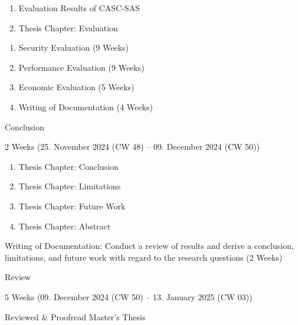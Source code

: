 \begin{description}
\begin{description}[style=multiline, leftmargin=\widthof{\textbf{Deliverables:}}]
        \begin{enumerate}[label=\alph*), leftmargin=\widthof{a)}+\labelsep]
            \item Evaluation Results of CASC-SAS
            \item Thesis Chapter: Evaluation
        \end{enumerate}
        \item[Increments:]
        \begin{enumerate}[label=\arabic*), leftmargin=\widthof{a)}+\labelsep]
            \item Security Evaluation (9 Weeks)
            \item Performance Evaluation (9 Weeks)
            \item Economic Evaluation (5 Weeks)
            \item Writing of Documentation (4 Weeks)
        \end{enumerate}
    \end{description}
    \item[Milestone IV:] Conclusion
    \begin{description}[style=multiline, leftmargin=\widthof{\textbf{Deliverables:}}]
        \item[Duration:] 2 Weeks (25. November 2024 (CW 48) -- 09. December 2024 (CW 50))
        \item[Deliverables:]
        \begin{enumerate}[label=\alph*), leftmargin=\widthof{a)}+\labelsep]
            \item Thesis Chapter: Conclusion
            \item Thesis Chapter: Limitations
            \item Thesis Chapter: Future Work
            \item Thesis Chapter: Abstract
        \end{enumerate}
        \item[Increment:] Writing of Documentation: Conduct a review of results and derive a conclusion, limitations, and future work with regard to the research questions (2 Weeks)
    \end{description}
    \item[Milestone V:] Review
    \begin{description}[style=multiline, leftmargin=\widthof{\textbf{Deliverables:}}]
        \item[Duration:] 5 Weeks (09. December 2024 (CW 50) -- 13. January 2025 (CW 03))
        \item[Deliverables:] Reviewed \& Proofread Master's Thesis

\end{description}
\end{description}
